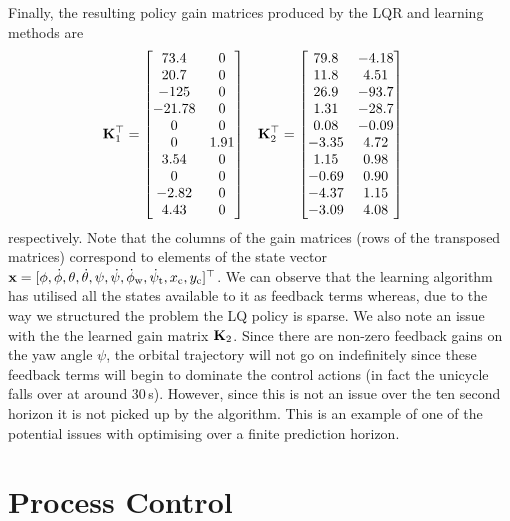 Finally, the resulting policy gain matrices produced by the LQR and learning methods are
\begin{align*}
\bK_1\T &= \bmat{
73.4 & 0 \\
20.7 & 0 \\
-125 & 0 \\
-21.78 & 0 \\
0 &  0 \\
0 & 1.91 \\
3.54 & 0   \\
0  & 0 \\
 -2.82 & 0 \\
 4.43 & 0 
} &
%
\bK_2\T &= \bmat{
79.8 & -4.18 \\
11.8 &  4.51 \\
26.9 & -93.7 \\
1.31 & -28.7 \\
0.08 & -0.09  \\
-3.35 & 4.72 \\
1.15 &  0.98 \\
-0.69 &  0.90 \\
-4.37 &  1.15 \\
-3.09 &  4.08 \\
} 
%
%
\end{align*}
respectively. Note that the columns of the gain matrices (rows of the transposed matrices) correspond to elements of the state vector $\mathbf{x} = [\phi, \dot\phi, \theta, \dot\theta, \psi, \dot\psi, \dot\phi_{\text{w}}, \dot\psi_\text{t},x_\text{c}, y_\text{c}]^\top$. We can observe that the learning algorithm has utilised all the states available to it as feedback terms whereas, due to the way we structured the problem the LQ policy is sparse. We also note an issue with the the learned gain matrix $\mathbf{K}_2$. Since there are non-zero feedback gains on the yaw angle $\psi$, the orbital trajectory will not go on indefinitely since these feedback terms will begin to dominate the control actions (in fact the unicycle falls over at around 30$\,$s). However, since this is not an issue over the ten second horizon it is not picked up by the algorithm. This is an example of one of the potential issues with optimising over a finite prediction horizon.







\section{Process Control} %


